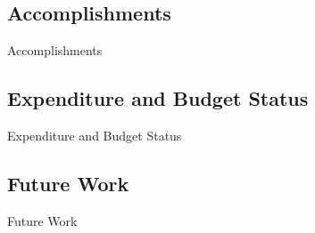 \documentclass[17pt, aspectratio=169]{beamer}
\begin{document}
\subsection{Accomplishments}
\begin{frame}{Accomplishments}

\end{frame}
\subsection{Expenditure and Budget Status}
\begin{frame}{Expenditure and Budget Status}

\end{frame}
\subsection{Future Work}
\begin{frame}{Future Work}

\end{frame}
\end{document}
